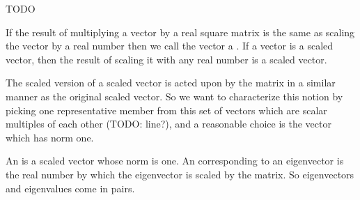 

TODO


If the result of multiplying a vector by a real square matrix is the same as scaling the vector by a real number then we call the vector a .
If a vector is a scaled vector, then the result of scaling it with any real number is a scaled vector.

The scaled version of a scaled vector is acted upon by the matrix in a similar manner as the original scaled vector.
So we want to characterize this notion by picking one representative member from this set of vectors which are scalar multiples of each other (TODO: line?), and a reasonable choice is the vector which has norm one.

An  is a scaled vector whose norm is one.
An  corresponding to an eigenvector is the real number by which the eigenvector is scaled by the matrix.
So eigenvectors and eigenvalues come in pairs.
